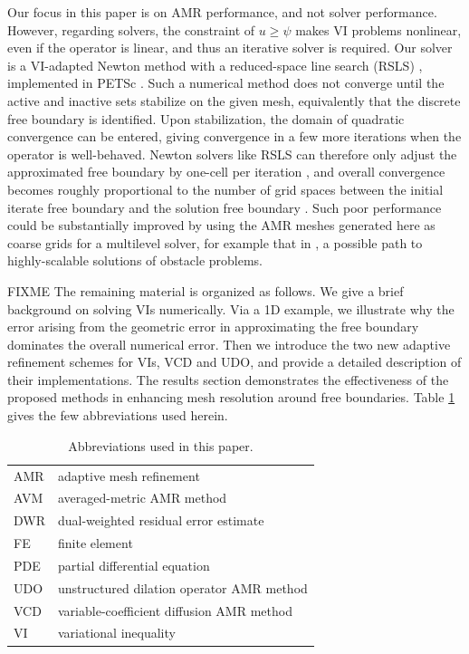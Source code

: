 \documentclass[]{interact}
\theoremstyle{plain}%
\theoremstyle{definition}
\theoremstyle{remark}
\begin{document}
Our focus in this paper is on AMR performance, and not solver performance.  However, regarding solvers, the constraint of $u \geq \psi$ makes VI problems nonlinear, even if the operator is linear, and thus an iterative solver is required.  Our solver is a VI-adapted Newton method with a reduced-space line search (RSLS) \cite{BensonMunson2006}, implemented in PETSc \cite{petsc-user-ref}.  Such a numerical method does not converge until the active and inactive sets stabilize on the given mesh, equivalently that the discrete free boundary is identified.  Upon stabilization, the domain of quadratic convergence can be entered, giving convergence in a few more iterations when the operator is well-behaved.  Newton solvers like RSLS can therefore only adjust the approximated free boundary by one-cell per iteration \citep{GraeserKornhuber2009}, and overall convergence becomes roughly proportional to the number of grid spaces between the initial iterate free boundary and the solution free boundary \citep{Bueler2021}.  Such poor performance could be substantially improved by using the AMR meshes generated here as coarse grids for a multilevel solver, for example that in \cite{BuelerFarrell2024}, a possible path to highly-scalable solutions of obstacle problems.

FIXME The remaining material is organized as follows.  We give a brief background on solving VIs numerically.  Via a 1D example, we illustrate why the error arising from the geometric error in approximating the free boundary dominates the overall numerical error.   Then we introduce the two new adaptive refinement schemes for VIs, VCD and UDO, and provide a detailed description of their implementations.  The results section demonstrates the effectiveness of the proposed methods in enhancing mesh resolution around free boundaries.  Table \ref{tab:abbrev} gives the few abbreviations used herein.

\begin{table}[H]
\centering
\begin{tabular}{l|l}
AMR       & adaptive mesh refinement \\
AVM       & averaged-metric AMR method \\
DWR       & dual-weighted residual error estimate \\
FE        & finite element \\
PDE       & partial differential equation \\
UDO       & unstructured dilation operator AMR method \\
VCD       & variable-coefficient diffusion AMR method \\
VI        & variational inequality
\end{tabular}

\caption{Abbreviations used in this paper.}
\label{tab:abbrev}
\end{table}
\end{document}
